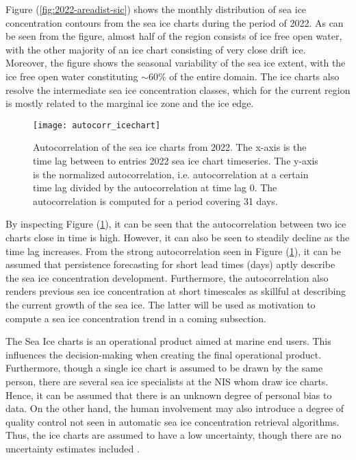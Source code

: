 \documentclass[../main/thesis.tex]{subfiles}
\begin{document}
Figure (\ref{fig:2022-areadist-sic}) shows the monthly distribution of sea ice concentration contours from the sea ice charts during the period of 2022. As can be seen from the figure, almost half of the region consists of ice free open water, with the other majority of an ice chart consisting of very close drift ice. Moreover, the figure shows the seasonal variability of the sea ice extent, with the ice free open water constituting $\sim60$\% of the entire domain. The ice charts also resolve the intermediate sea ice concentration classes, which for the current region is mostly related to the marginal ice zone and the ice edge.

\begin{figure}
    \centering
    \texttt{[image: autocorr\_icechart]}
    \caption{\label{fig:autocorr}Autocorrelation of the sea ice charts from 2022. The x-axis is the time lag between to entries 2022 sea ice chart timeseries. The y-axis is the normalized autocorrelation, i.e. autocorrelation at a certain time lag divided by the autocorrelation at time lag 0. The autocorrelation is computed for a period covering 31 days.}
\end{figure}

By inspecting Figure (\ref{fig:autocorr}), it can be seen that the autocorrelation between two ice charts close in time is high. However, it can also be seen to steadily decline as the time lag increases. From the strong autocorrelation seen in Figure (\ref{fig:autocorr}), it can be assumed that persistence forecasting for short lead times (days) aptly describe the sea ice concentration development. Furthermore, the autocorrelation also renders previous sea ice concentration at short timescales as skillful at describing the current growth of the sea ice. The latter will be used as motivation to compute a sea ice concentration trend in a coming subsection.

The Sea Ice charts is an operational product aimed at marine end users. This influences the decision-making when creating the final operational product. Furthermore, though a single ice chart is assumed to be drawn by the same person, there are several sea ice specialists at the NIS whom draw ice charts. Hence, it can be assumed that there is an unknown degree of personal bias to data. On the other hand, the human involvement may also introduce a degree of quality control not seen in automatic sea ice concentration retrieval algorithms. Thus, the ice charts are assumed to have a low uncertainty, though there are no uncertainty estimates included \citep{Dinessen2020}.
\end{document}

